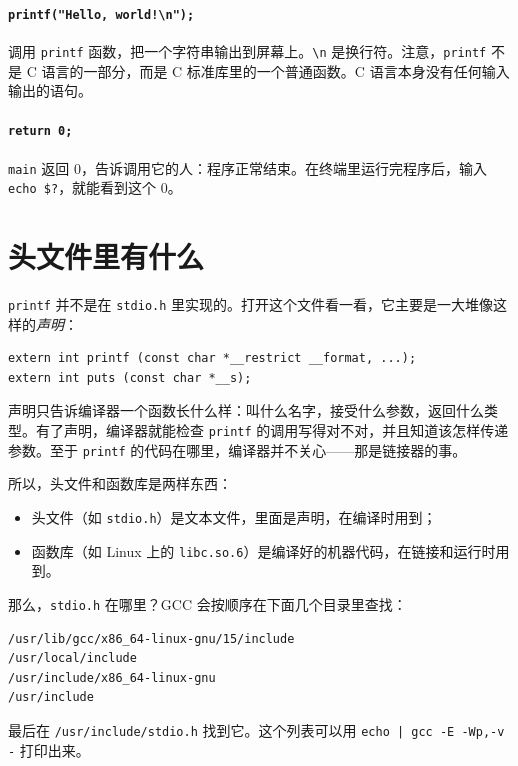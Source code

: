 \paragraph{\texttt{printf("Hello, world!\textbackslash n");}}
调用 \texttt{printf} 函数，把一个字符串输出到屏幕上。\texttt{\textbackslash n} 是换行符。注意，\texttt{printf} 不是 C 语言的一部分，而是 C 标准库里的一个普通函数。C 语言本身没有任何输入输出的语句。

\paragraph{\texttt{return 0;}}
\texttt{main} 返回 0，告诉调用它的人：程序正常结束。在终端里运行完程序后，输入 \texttt{echo \$?}，就能看到这个 0。

\section{头文件里有什么}
\label{sec:stdio-h}

\texttt{printf} 并不是在 \texttt{stdio.h} 里实现的。打开这个文件看一看，它主要是一大堆像这样的\emph{声明}：
\begin{verbatim}
extern int printf (const char *__restrict __format, ...);
extern int puts (const char *__s);
\end{verbatim}

声明只告诉编译器一个函数长什么样：叫什么名字，接受什么参数，返回什么类型。有了声明，编译器就能检查 \texttt{printf} 的调用写得对不对，并且知道该怎样传递参数。至于 \texttt{printf} 的代码在哪里，编译器并不关心——那是链接器的事。

所以，头文件和函数库是两样东西：
\begin{itemize}
  \item 头文件（如 \texttt{stdio.h}）是文本文件，里面是声明，在编译时用到；
  \item 函数库（如 Linux 上的 \texttt{libc.so.6}）是编译好的机器代码，在链接和运行时用到。
\end{itemize}

那么，\texttt{stdio.h} 在哪里？GCC 会按顺序在下面几个目录里查找：
\begin{verbatim}
/usr/lib/gcc/x86_64-linux-gnu/15/include
/usr/local/include
/usr/include/x86_64-linux-gnu
/usr/include
\end{verbatim}
最后在 \texttt{/usr/include/stdio.h} 找到它。这个列表可以用 \texttt{echo | gcc -E -Wp,-v -} 打印出来。

